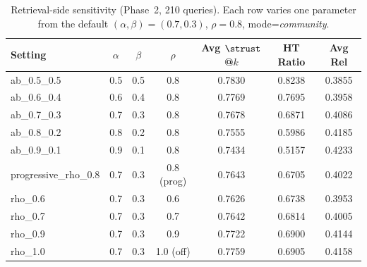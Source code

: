 \begin{table}[t]
\centering\small
\caption{Retrieval-side sensitivity (Phase~2, 210 queries). Each row varies one parameter from the default $(\alpha,\beta)=(0.7,0.3)$, $\rho=0.8$, mode=\textit{community}.}
\label{tab:appendix-phase2}
\begin{tabular}{lcccccc}
\toprule
Setting & $\alpha$ & $\beta$ & $\rho$ & Avg $\strust$@$k$ & HT Ratio & Avg Rel \\
\midrule
ab\_0.5\_0.5 & 0.5 & 0.5 & 0.8 & 0.7830 & 0.8238 & 0.3855 \\
ab\_0.6\_0.4 & 0.6 & 0.4 & 0.8 & 0.7769 & 0.7695 & 0.3958 \\
ab\_0.7\_0.3 & 0.7 & 0.3 & 0.8 & 0.7678 & 0.6871 & 0.4086 \\
ab\_0.8\_0.2 & 0.8 & 0.2 & 0.8 & 0.7555 & 0.5986 & 0.4185 \\
ab\_0.9\_0.1 & 0.9 & 0.1 & 0.8 & 0.7434 & 0.5157 & 0.4233 \\
progressive\_rho\_0.8 & 0.7 & 0.3 & 0.8 (prog) & 0.7643 & 0.6705 & 0.4022 \\
rho\_0.6 & 0.7 & 0.3 & 0.6 & 0.7626 & 0.6738 & 0.3953 \\
rho\_0.7 & 0.7 & 0.3 & 0.7 & 0.7642 & 0.6814 & 0.4005 \\
rho\_0.9 & 0.7 & 0.3 & 0.9 & 0.7722 & 0.6900 & 0.4144 \\
rho\_1.0 & 0.7 & 0.3 & 1.0 (off) & 0.7759 & 0.6905 & 0.4158 \\
\bottomrule
\end{tabular}
\end{table}
